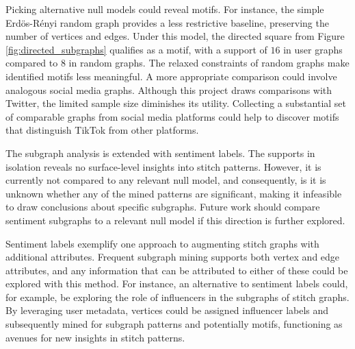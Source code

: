 Picking alternative null models could reveal motifs. For instance, the simple Erdös-Rényi random graph provides a less restrictive baseline, preserving the number of vertices and edges. Under this model, the directed square from Figure \ref{fig:directed_subgraphs} qualifies as a motif, with a support of $16$ in user graphs compared to $8$ in random graphs. The relaxed constraints of random graphs make identified motifs less meaningful. A more appropriate comparison could involve analogous social media graphs. Although this project draws comparisons with Twitter, the limited sample size diminishes its utility. Collecting a substantial set of comparable graphs from social media platforms could help to discover motifs that distinguish TikTok from other platforms.

The subgraph analysis is extended with sentiment labels. The supports in isolation reveals no surface-level insights into stitch patterns. However, it is currently not compared to any relevant null model, and consequently, is it is unknown whether any of the mined patterns are significant, making it infeasible to draw conclusions about specific subgraphs. Future work should compare sentiment subgraphs to a relevant null model if this direction is further explored. 

Sentiment labels exemplify one approach to augmenting stitch graphs with additional attributes. Frequent subgraph mining supports both vertex and edge attributes, and any information that can be attributed to either of these could be explored with this method. For instance, an alternative to sentiment labels could, for example, be exploring the role of influencers in the subgraphs of stitch graphs. By leveraging user metadata, vertices could be assigned influencer labels and subsequently mined for subgraph patterns and potentially motifs, functioning as avenues for new insights in stitch patterns. 






